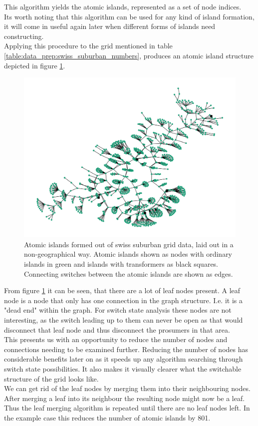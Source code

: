 This algorithm yields the atomic islands, represented as a set of node indices.\\
Its worth noting that this algorithm can be used for any kind of island formation,
it will come in useful again later when different forms of islands need constructing.\\

Applying this procedure to the grid mentioned in table \ref{table:data_prep:swiss_suburban_numbers},
produces an atomic island structure depicted in figure \ref{fig:data_prep:swiss_suburb_with_leafs}.

\begin{figure}[H]
    \begin{center}
        \includegraphics[width=.7\linewidth]{img/switchstate_exploring/swiss_suburb/topology_with_leafs.png}
    \end{center}
    \caption{
        Atomic islands formed out of swiss suburban grid data, laid out in a non-geographical way.
        Atomic islands shown as nodes with 
        ordinary islands in green and islands with transformers as black squares. Connecting switches between the
        atomic islands are shown as edges.
    }
    \label{fig:data_prep:swiss_suburb_with_leafs}
\end{figure}

From figure \ref{fig:data_prep:swiss_suburb_with_leafs} it can be seen, that
there are a lot of leaf nodes present. A leaf node is a node that only has
one connection in the graph structure. I.e. it is a "dead end" within the graph.
For switch state analysis these nodes are not interesting, as the switch leading
up to them can never be open as that would disconnect that leaf node and thus
disconnect the prosumers in that area.\\
This presents us with an opportunity to
reduce the number of nodes and connections needing to be examined further. Reducing the number of
nodes has considerable benefits later on as it speeds up any algorithm
searching through switch state possibilities. It also makes it visually clearer
what the switchable structure of the grid looks like. \\
We can get rid of the leaf nodes by merging them into their neighbouring nodes. 
After merging a leaf into its neighbour the resulting node might now be a leaf. Thus 
the leaf merging algorithm is repeated until there are no leaf nodes left. In the example
case this reduces the number of atomic islands by 801.

